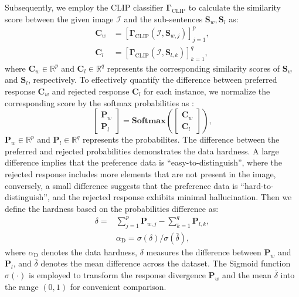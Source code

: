 Subsequently, we employ the CLIP classifier $\mathbf{\Gamma}_{\mathrm{CLIP}}$ to calculate the similarity score between the given image $\mathcal{I}$ and the sub-sentences $\mathbf{S}_{w}, \mathbf{S}_{l}$ as:
\begin{equation}
\label{equ:subsentence-score}
\begin{aligned}
\mathbf{C}_{w} &= \left[ \mathbf{\Gamma}_{\mathrm{CLIP}}(\mathcal{I}, \mathbf{S}_{w,j}) \right]_{j=1}^{p}, \\
\mathbf{C}_{l} &= \left[ \mathbf{\Gamma}_{\mathrm{CLIP}}(\mathcal{I}, \mathbf{S}_{l,k}) \right]_{k=1}^{q},
\end{aligned}
\end{equation}
where $\mathbf{C}_{w} \in \mathbb{R}^{p}$ and $\mathbf{C}_{l} \in \mathbb{R}^{q}$ represents the corresponding similarity scores of $\mathbf{S}_{w}$ and $ \mathbf{S}_{l}$, respectively. 
To effectively quantify the difference between preferred response $\mathbf{C}_{w}$ and rejected response $\mathbf{C}_{l}$ for each instance, 
we normalize the corresponding score by the softmax probabilities as :
\begin{equation}
\label{equ:subsentence-prob}
\left[ \begin{array}{c}
\mathbf{P}_{w} \\
\mathbf{P}_{l}
\end{array} \right] = 
\mathbf{Softmax}   \left (  \left[ \begin{array}{c}
    \mathbf{C}_{w} \\
    \mathbf{C}_{l}
    \end{array} \right]  \right ) ,
\end{equation}
$\mathbf{P}_{w} \in \mathbb{R}^{p}$ and $\mathbf{P}_{l} \in \mathbb{R}^{q}$ represents the probabilites. 
The difference between the preferred and rejected probabilities demonstrates the data hardness. A large difference implies that the preference data is ``easy-to-distinguish'', where the rejected response includes more elements that are not present in the image, conversely, a small difference suggests that the preference data is ``hard-to-distinguish'', and the rejected response exhibits minimal hallucination. 
Then we define the hardness based on the probabilities difference as:
\begin{align}
    \label{equ:difference}
        \delta = & \sum_{j=1}^{p} \mathbf{P}_{w,j} - \sum_{k=1}^{q} \mathbf{P}_{l,k}, \\
    \label{equ:alpha_v}
    & \alpha_{\mathrm{D}} = \sigma(\delta) / \sigma(\bar{\delta}),
\end{align}
where $\alpha_{\mathrm{D}}$ denotes the data hardness, $\delta$ measures the difference between $\mathbf{P}_{w}$ and $\mathbf{P}_{l}$, and $\bar{\delta}$ denotes the mean difference across the dataset. The Sigmoid function $\sigma(\cdot)$ is employed to transform the response divergence $\mathbf{P}_{w}$ and the mean $\bar{\delta}$ into the range $(0, 1)$ for convenient comparison.

